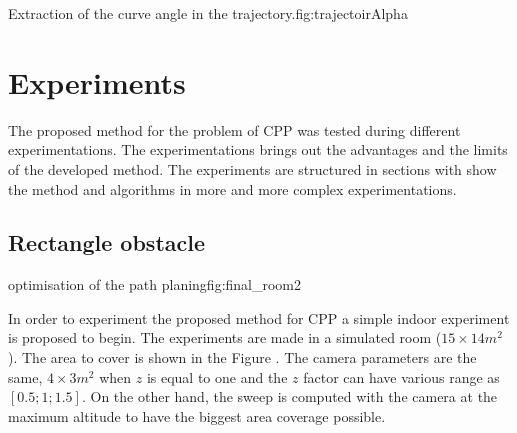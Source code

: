  \begin{mfigures}[!]{Extraction of the curve angle in the trajectory.}{fig:trajectoirAlpha} \centering
{}
\end{mfigures} 
	
	
				



			\section{Experiments} \label{sec:experiment}
			
The proposed method for the problem of CPP was tested during different experimentations. The experimentations brings out the advantages and the limits of the developed method. The experiments are structured in sections with show the method and algorithms in more and more complex experimentations.

\subsection{Rectangle obstacle} \label{experiment}

 \begin{mfigures}[!]{optimisation of the path planing}{fig:final_room2} \centering
\hspace{1cm}

\tabsVrepPath
\end{mfigures} 

In order to experiment the proposed method for CPP a simple indoor experiment is proposed to begin.
The experiments are made in a simulated room ($15 \times 14 m^2$). The area to cover is shown in the Figure . The camera parameters are the same, $4 \times 3 m^2$ when $z$ is equal to one and the $z$ factor can have various range as $[0.5;1;1.5]$. On the other hand, the sweep is computed with the camera at the maximum altitude to have the biggest area coverage possible.

